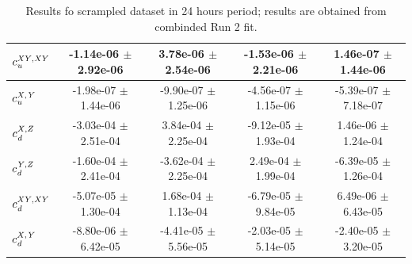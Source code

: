 \begin{table}
\begin{center}
{\begin{tabular}{| l| c| c| c| c|}
                    \hline 
                    $c_{\it u}^{\it XY,XY}$  & -1.14e-06 $\pm$ 2.92e-06 & 3.78e-06 $\pm$ 2.54e-06 & -1.53e-06 $\pm$ 2.21e-06 & 1.46e-07 $\pm$ 1.44e-06\\
                    \hline 
                    $c_{\it u}^{\it X,Y}$  & -1.98e-07 $\pm$ 1.44e-06 & -9.90e-07 $\pm$ 1.25e-06 & -4.56e-07 $\pm$ 1.15e-06 & -5.39e-07 $\pm$ 7.18e-07\\
                    \hline 
                    $c_{\it d}^{\it X,Z}$  & -3.03e-04 $\pm$ 2.51e-04 & 3.84e-04 $\pm$ 2.25e-04 & -9.12e-05 $\pm$ 1.93e-04 & 1.46e-06 $\pm$ 1.24e-04\\
                    \hline 
                    $c_{\it d}^{\it Y,Z}$  & -1.60e-04 $\pm$ 2.41e-04 & -3.62e-04 $\pm$ 2.25e-04 & 2.49e-04 $\pm$ 1.99e-04 & -6.39e-05 $\pm$ 1.26e-04\\
                    \hline 
                    $c_{\it d}^{\it XY,XY}$  & -5.07e-05 $\pm$ 1.30e-04 & 1.68e-04 $\pm$ 1.13e-04 & -6.79e-05 $\pm$ 9.84e-05 & 6.49e-06 $\pm$ 6.43e-05\\
                    \hline 
                    $c_{\it d}^{\it X,Y}$  & -8.80e-06 $\pm$ 6.42e-05 & -4.41e-05 $\pm$ 5.56e-05 & -2.03e-05 $\pm$ 5.14e-05 & -2.40e-05 $\pm$ 3.20e-05\\
                    \hline 
                    \hline
                    \end{tabular}
                    }%
                    \end{center}
                    \caption{ Results fo scrampled dataset in 24 hours period;
                    results are obtained from combinded Run 2 fit.
                   \label{table:scrambled_24hour}}
\end{table}
                    
